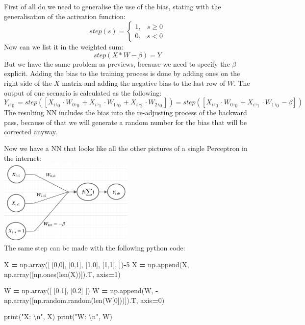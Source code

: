 \documentclass[
]{book}
\newenvironment{Shaded}{\begin{snugshade}}{\end{snugshade}}
\newcommand{\BuiltInTok}[1]{#1}
\newcommand{\CharTok}[1]{\textcolor[rgb]{0.31,0.60,0.02}{#1}}
\newcommand{\DecValTok}[1]{\textcolor[rgb]{0.00,0.00,0.81}{#1}}
\newcommand{\FloatTok}[1]{\textcolor[rgb]{0.00,0.00,0.81}{#1}}
\newcommand{\NormalTok}[1]{#1}
\newcommand{\OperatorTok}[1]{\textcolor[rgb]{0.81,0.36,0.00}{\textbf{#1}}}
\newcommand{\StringTok}[1]{\textcolor[rgb]{0.31,0.60,0.02}{#1}}
\begin{document}
First of all do we need to generalise the use of the bias, stating with the generalisation of the activation function:
\[ 
step(s)= 
\begin{cases}
    1,& s   \geq 0\\
    0,& s < 0
\end{cases}
\]
Now can we list it in the weighted sum:
\[
  step(X * W - \beta) = Y
\]
But we have the same problem as previews, because we need to specify the \(\beta\) explicit. Adding the bias to the training process is done by adding ones on the right side of the \(X\) matrix and adding the negative bias to the last row of \(W\). The output of one scenario is calculated as the following:
\[
  Y_i,_0 = step([X_i,_0 \cdot W_0,_0 + X_i,_1 \cdot W_1,_0 + X_i,_2 \cdot W_2,_0]) = step([X_i,_0 \cdot W_0,_0 + X_i,_1 \cdot W_1,_0 - \beta])
\]
The resulting NN includes the bias into the re-adjusting process of the backward pass, because of that we will generate a random number for the bias that will be corrected anyway.

Now we have a NN that looks like all the other pictures of a single Perceptron in the internet:\\
\includegraphics[width=0.5\textwidth,height=\textheight]{./img/NN_02.png}\\
The same step can be made with the following python code:

\begin{Shaded}
\begin{Highlighting}[]
\NormalTok{X }\OperatorTok{=}\NormalTok{ np.array([}
\NormalTok{  [}\DecValTok{0}\NormalTok{,}\DecValTok{0}\NormalTok{],}
\NormalTok{  [}\DecValTok{0}\NormalTok{,}\DecValTok{1}\NormalTok{],}
\NormalTok{  [}\DecValTok{1}\NormalTok{,}\DecValTok{0}\NormalTok{],}
\NormalTok{  [}\DecValTok{1}\NormalTok{,}\DecValTok{1}\NormalTok{],}
\NormalTok{])}\OperatorTok{{-}}\DecValTok{5}
\NormalTok{X }\OperatorTok{=}\NormalTok{ np.append(X, np.array([np.ones(}\BuiltInTok{len}\NormalTok{(X))]).T, axis}\OperatorTok{=}\DecValTok{1}\NormalTok{)}

\NormalTok{W }\OperatorTok{=}\NormalTok{ np.array([}
\NormalTok{  [}\FloatTok{0.1}\NormalTok{], }
\NormalTok{  [}\FloatTok{0.2}\NormalTok{]}
\NormalTok{])}
\NormalTok{W }\OperatorTok{=}\NormalTok{ np.append(W, }\OperatorTok{{-}}\NormalTok{np.array([np.random.random(}\BuiltInTok{len}\NormalTok{(W[}\DecValTok{0}\NormalTok{]))]).T, axis}\OperatorTok{=}\DecValTok{0}\NormalTok{)}

\BuiltInTok{print}\NormalTok{(}\StringTok{"X: }\CharTok{\textbackslash{}n}\StringTok{"}\NormalTok{, X)}
\BuiltInTok{print}\NormalTok{(}\StringTok{"W: }\CharTok{\textbackslash{}n}\StringTok{"}\NormalTok{, W)}
\end{Highlighting}
\end{Shaded}
\end{document}

